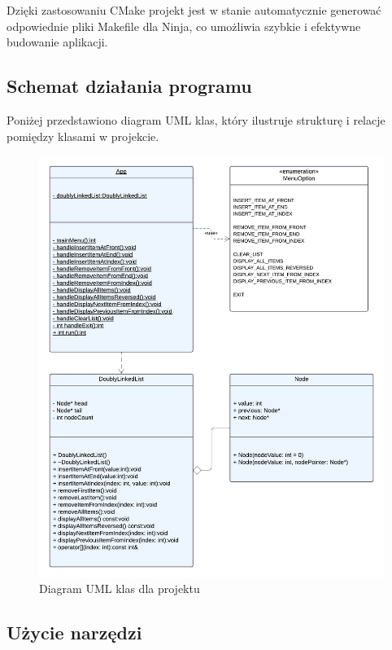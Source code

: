 Dzięki zastosowaniu CMake projekt jest w stanie automatycznie generować odpowiednie pliki Makefile dla Ninja, co umożliwia szybkie i efektywne budowanie aplikacji.

\subsection{Schemat działania programu}

Poniżej przedstawiono diagram UML klas, który ilustruje strukturę i relacje pomiędzy klasami w projekcie.

\begin{figure}[!htb]
  \begin{center}
    \includegraphics[width=\textwidth]{rys/diagram_UML.png}
    \caption{Diagram UML klas dla projektu}\label{fig:uml_diagram}
  \end{center}
\end{figure}

\subsection{Użycie narzędzi}

